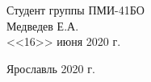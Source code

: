 \begin{titlepage}
\begin{minipage}{0.45\textwidth}
	\end{minipage}%
	\vfill
	
	\hfill\begin{minipage}{0.45\textwidth}
		\begin{flushright}
			Студент группы ПМИ-41БО \\
			\underline{\hspace{3cm}} Медведев Е.А.\\
			<<16>> июня 2020 г.
		\end{flushright}
	\end{minipage}%
	\vfill
	
	\begin{center}
		Ярославль 2020 г.
	\end{center}
\end{titlepage}